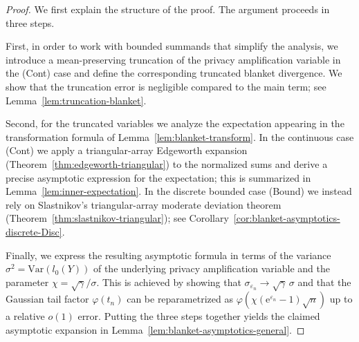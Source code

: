 \documentclass{article}
\theoremstyle{plain}
\theoremstyle{definition}
\begin{document}
\begin{proof}



We first explain the structure of the proof.
The argument proceeds in three steps.

First, in order to work with bounded summands that simplify the analysis, we introduce a
mean-preserving truncation of the privacy amplification variable in the (Cont) case and define the corresponding truncated blanket divergence. 
We show that the truncation error is negligible compared to the main term; see Lemma~\ref{lem:truncation-blanket}.


Second, for the truncated variables we analyze the expectation appearing in
the transformation formula of Lemma~\ref{lem:blanket-transform}.  In the
continuous case (Cont) we apply a triangular-array Edgeworth expansion
(Theorem~\ref{thm:edgeworth-triangular}) to the normalized sums and derive
a precise asymptotic expression for the expectation; this is
summarized in Lemma~\ref{lem:inner-expectation}.  In the discrete bounded
case (Bound) we instead rely on Slastnikov's triangular-array moderate
deviation theorem (Theorem~\ref{thm:slastnikov-triangular}); see
Corollary~\ref{cor:blanket-asymptotics-discrete-Disc}.


Finally, we express the resulting asymptotic formula in terms of the
variance
\(
  \sigma^2 = \mathrm{Var}(l_0(Y))
\)
of the underlying privacy amplification variable and the parameter
\(
  \chi = \sqrt{\gamma}/\sigma.
\)
This is achieved by showing that
\(
  \sigma_{\varepsilon_n} \to \sqrt{\gamma}\,\sigma
\)
and that the Gaussian tail factor
\(
  \varphi(t_n)
\)
can be reparametrized as
\(
  \varphi(\chi(\mathrm e^{\varepsilon_n}-1)\sqrt{n})
\)
up to a relative $o(1)$ error.  Putting the three steps together yields
the claimed asymptotic expansion in Lemma~\ref{lem:blanket-asymptotics-general}.



\end{proof}
\end{document}
